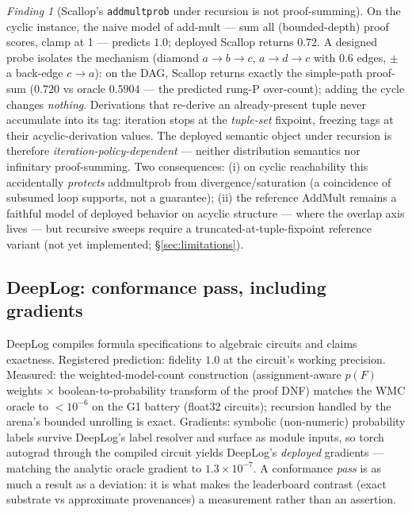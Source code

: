 \documentclass[10pt]{article}
\theoremstyle{remark}
\newtheorem{finding}{Finding}
\begin{document}
\begin{finding}[Scallop's \texttt{addmultprob} under recursion is not proof-summing]
\label{find:scallop}
On the cyclic instance, the naive model of add-mult --- sum all (bounded-depth) proof scores,
clamp at 1 --- predicts $1.0$; deployed Scallop returns $0.72$. A designed probe isolates the
mechanism (diamond $a{\to}b{\to}c$, $a{\to}d{\to}c$ with $0.6$ edges, $\pm$ a back-edge
$c{\to}a$): on the DAG, Scallop returns exactly the simple-path proof-sum ($0.720$ vs oracle
$0.5904$ --- the predicted rung-P over-count); adding the cycle changes \emph{nothing}.
Derivations that re-derive an already-present tuple never accumulate into its tag: iteration stops
at the \emph{tuple-set} fixpoint, freezing tags at their acyclic-derivation values. The deployed
semantic object under recursion is therefore \emph{iteration-policy-dependent} --- neither
distribution semantics nor infinitary proof-summing. Two consequences: (i) on cyclic
reachability this accidentally \emph{protects} addmultprob from divergence/saturation (a
coincidence of subsumed loop supports, not a guarantee); (ii) the reference AddMult remains a
faithful model of deployed behavior on acyclic structure --- where the overlap axis lives --- but
recursive sweeps require a truncated-at-tuple-fixpoint reference variant (not yet implemented;
\S\ref{sec:limitations}).
\end{finding}

\subsection{DeepLog: conformance pass, including gradients}

DeepLog compiles formula specifications to algebraic circuits and claims exactness. Registered
prediction: fidelity $1.0$ at the circuit's working precision. Measured: the
weighted-model-count construction (assignment-aware $p(F)$ weights $\times$ boolean-to-probability
transform of the proof DNF) matches the WMC oracle to $<10^{-6}$ on the G1 battery (float32
circuits); recursion handled by the arena's bounded unrolling is exact. Gradients: symbolic
(non-numeric) probability labels survive DeepLog's label resolver and surface as module inputs, so
torch autograd through the compiled circuit yields DeepLog's \emph{deployed} gradients ---
matching the analytic oracle gradient to $1.3\times10^{-7}$. A conformance \emph{pass} is as much
a result as a deviation: it is what makes the leaderboard contrast (exact substrate vs approximate
provenances) a measurement rather than an assertion.
\end{document}
